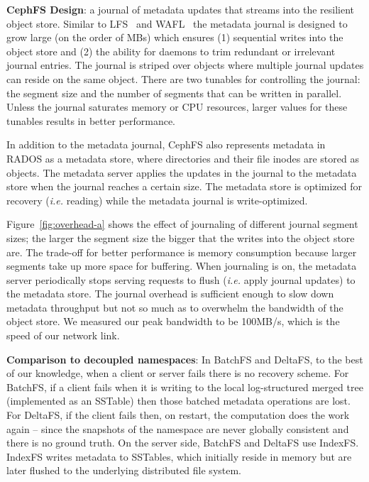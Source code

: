 \textbf{CephFS Design}: a journal of metadata updates that streams into the
resilient object store. Similar to LFS~\cite{rosenblum:acm1992-LFS} and
WAFL~\cite{hitz:wtec1994-WAFL} the metadata journal is designed to grow large
(on the order of MBs) which ensures (1) sequential writes into the object store
and (2) the ability for daemons to trim redundant or irrelevant journal
entries.  The journal is striped over objects where multiple journal updates
can reside on the same object. There are two tunables for controlling the
journal: the segment size and the number of segments that can be written in
parallel. Unless the journal saturates memory or CPU resources, larger values
for these tunables results in better performance.

In addition to the metadata journal, CephFS also represents metadata in RADOS
as a metadata store, where directories and their file inodes are stored as
objects.  The metadata server applies the updates in the journal to the
metadata store when the journal reaches a certain size. The metadata store is
optimized for recovery ({\it i.e.} reading) while the metadata journal is
write-optimized.


Figure~\ref{fig:overhead-a} shows the
effect of journaling of different journal segment sizes; the larger the segment
size the bigger that the writes into the object store are. The trade-off for
better performance is memory consumption because larger segments take up
more space for buffering. When journaling is on, 
the metadata server periodically stops serving requests to flush ({\it i.e.}
apply journal updates) to the metadata store.  The journal overhead is
sufficient enough to slow down metadata throughput but not so much as to
overwhelm the bandwidth of the object store. We measured our peak bandwidth to
be 100MB/s, which is the speed of our network link.

\textbf{Comparison to decoupled namespaces}: In BatchFS and DeltaFS,
to the best of our knowledge, when a client or server fails there is no recovery
scheme. For BatchFS, if a client fails when it is writing to the local
log-structured merged tree (implemented as an SSTable) then those batched
metadata operations are lost. For DeltaFS, if the client fails then, on restart,
the computation does the work again -- since the snapshots of the namespace are
never globally consistent and there is no ground truth.  On the server side,
BatchFS and DeltaFS use IndexFS. IndexFS writes metadata to SSTables, which
initially reside in memory but are later flushed to the underlying
distributed file system.


